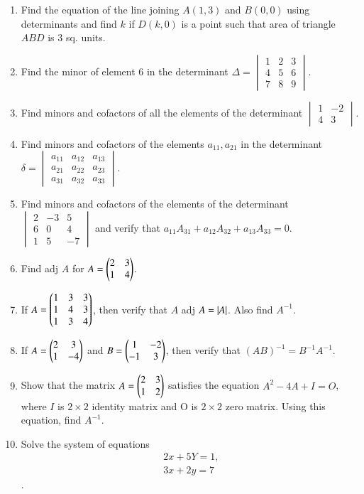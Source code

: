 \documentclass{article}
\theoremstyle{remark}
\begin{document}
\begin{enumerate}
\item Find the equation of the line joining $A(1,3)$ and $B(0,0)$ using determinants and find  $k$ if $D(k,0)$ is a point such that area of triangle $ABD$ is $3$ sq. units.
\item Find the minor of element $6$ in the determinant $\Delta= \begin{vmatrix}1&2&3 \\4&5&6 \\7&8&9 \end{vmatrix}$.
\item Find minors and cofactors of all the elements of the determinant $\begin{vmatrix} 1&-2 \\ 4&3 \end{vmatrix}$.
\item Find minors and cofactors of the elements $a_{11}, a_{21}$ in the determinant $\delta= \begin{vmatrix} a_{11}&a_{12}&a_{13} \\a_{21}&a_{22}&a_{23} \\a_{31}&a_{32}&a_{33} \end{vmatrix}$.
\item Find minors and cofactors of the elements of the determinant $\begin{vmatrix} 2&-3&5 \\6&0&4 \\1&5&-7 \end{vmatrix}$ and verify that $a_{11}A_{31} + a_{12}A_{32} + a_{13}A_{33} = 0$.
\item Find adj $A$ for $A=\begin{pmatrix}2&3 \\ 1&4\end{pmatrix}$.
\item If $A=\begin{pmatrix}1&3&3 \\1&4&3 \\ 1&3&4\end{pmatrix}$, then verify that $A$ adj $A = \left\vert A\right\vert$. Also find $A^{-1}$.
\item If $A=\begin{pmatrix}2&3 \\1&-4\end{pmatrix}$ and $B=\begin{pmatrix}1&-2 \\-1&3\end{pmatrix}$, then verify that $(AB)^{-1} = B^{-1}A^{-1}$.
\item Show that the matrix $A=\begin{pmatrix}2&3 \\1&2\end{pmatrix}$ satisfies the equation $A^2-4A+I=O$, where $I$ is $2\times 2$ identity matrix and O is $2\times 2$ zero matrix. Using this equation, find $A^{-1}$.
\item Solve the system of equations
 \begin{align}2x+5Y=1,\\ 3x+2y=7\end{align}.

\end{enumerate}
\end{document}
